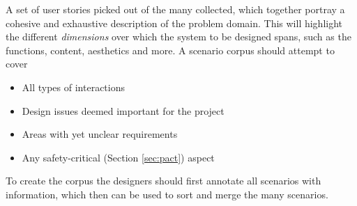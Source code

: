 \begin{definition} \label{def:scenario_corpus} 
  A set of user stories picked out of the many collected, which together portray a cohesive and exhaustive description of the problem domain. This will highlight the different \emph{dimensions} over which the system to be designed spans, such as the functions, content, aesthetics and more. A scenario corpus should attempt to cover \cite[p. 67-68, 197]{benyon14}
  \begin{itemize}
    \item All types of interactions
    \item Design issues deemed important for the project
    \item Areas with yet unclear requirements
    \item Any safety-critical (Section \ref{sec:pact}) aspect
  \end{itemize}
  To create the corpus the designers should first annotate all scenarios with information, which then can be used to sort and merge the many scenarios. \cite[p. 198]{benyon14}   
\end{definition}